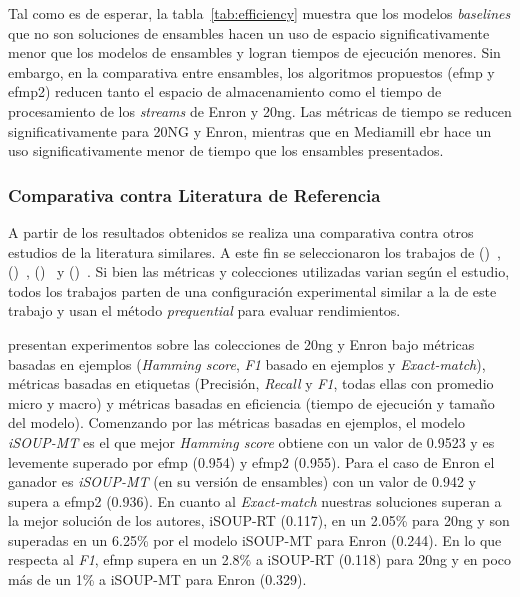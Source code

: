 Tal como es de esperar, la tabla~\ref{tab:efficiency} muestra que los modelos
\textit{baselines} que no son soluciones de ensambles hacen un uso de espacio
significativamente menor que los modelos de ensambles y logran tiempos de
ejecución menores. Sin embargo, en la comparativa entre ensambles, los
algoritmos propuestos (\acrshort{efmp} y \acrshort{efmp2}) reducen tanto el
espacio de almacenamiento como el tiempo de procesamiento de los
\textit{streams} de Enron y 20ng. Las métricas de tiempo se reducen
significativamente para 20NG y Enron, mientras que en Mediamill \acrshort{ebr}
hace un uso significativamente menor de tiempo que los ensambles presentados.

\subsubsection{Comparativa contra Literatura de Referencia}

A partir de los resultados obtenidos se realiza una comparativa contra otros
estudios de la literatura similares. A este fin se seleccionaron los trabajos de
\citeauthor{osojnik_multi-label_2017}
(\citeyear{osojnik_multi-label_2017})~\cite{osojnik_multi-label_2017},
\citeauthor{roseberry_multi-label_2018}
(\citeyear{roseberry_multi-label_2018})~\cite{roseberry_multi-label_2018},
\citeauthor{buyukcakir_novel_2018}
(\citeyear{buyukcakir_novel_2018})~\cite{buyukcakir_novel_2018} y
\citeauthor{sousa_multi-label_2018}
(\citeyear{sousa_multi-label_2018})~\cite{sousa_multi-label_2018}. Si bien las
métricas y colecciones utilizadas varian según el estudio, todos los trabajos
parten de una configuración experimental similar a la de este trabajo y usan el
método \textit{prequential} para evaluar rendimientos.

\citeauthor{osojnik_multi-label_2017} presentan experimentos sobre las
colecciones de 20ng y Enron bajo métricas basadas en ejemplos (\textit{Hamming
	score}, \textit{F1} basado en ejemplos y \textit{Exact-match}), métricas basadas
en etiquetas (Precisión, \textit{Recall} y \textit{F1}, todas ellas con promedio
micro y macro) y métricas basadas en eficiencia (tiempo de ejecución y tamaño
del modelo). Comenzando por las métricas basadas en ejemplos, el modelo
\textit{iSOUP-MT} es el que mejor \textit{Hamming score} obtiene con un valor de
0.9523 y es levemente superado por \acrshort{efmp} (0.954) y \acrshort{efmp2}
(0.955). Para el caso de Enron el ganador es \textit{iSOUP-MT} (en su versión de
ensambles) con un valor de 0.942 y supera a \acrshort{efmp2} (0.936). En cuanto
al \textit{Exact-match} nuestras soluciones superan a la mejor solución de los
autores, iSOUP-RT (0.117), en un 2.05\% para 20ng y son superadas en un 6.25\%
por el modelo iSOUP-MT para Enron (0.244). En lo que respecta al \textit{F1},
\acrshort{efmp} supera en un 2.8\% a iSOUP-RT (0.118) para 20ng y en poco más de
un 1\% a iSOUP-MT para Enron (0.329).

